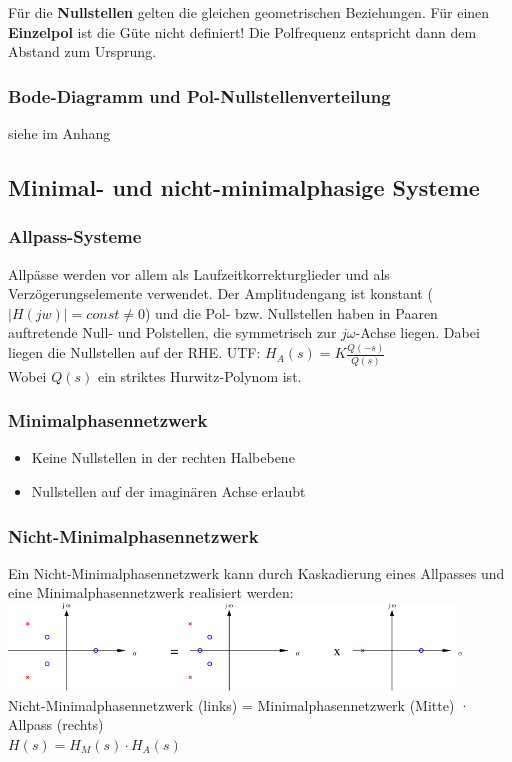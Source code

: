  Für die \textbf{Nullstellen} gelten die gleichen geometrischen Beziehungen.
  Für einen \textbf{Einzelpol} ist die Güte nicht definiert! Die Polfrequenz entspricht dann dem Abstand zum Ursprung.
  
  \subsubsection{Bode-Diagramm und Pol-Nullstellenverteilung}
  siehe im Anhang

\subsection{Minimal- und nicht-minimalphasige Systeme }
\subsubsection{Allpass-Systeme}
Allpässe werden vor allem als Laufzeitkorrekturglieder und als
Verzögerungselemente verwendet. Der Amplitudengang ist konstant ($|H(jw)| =
const \neq 0$) und die Pol- bzw. Nullstellen haben in Paaren auftretende Null-
und Polstellen, die symmetrisch zur $j \omega$-Achse liegen. Dabei liegen die
Nullstellen auf der RHE.
UTF: $H_A(s) = K \frac{Q(-s)}{Q(s)}$ \\
Wobei $Q(s)$ ein striktes Hurwitz-Polynom ist.



\subsubsection{Minimalphasennetzwerk }
\begin{itemize}
  \item Keine Nullstellen in der rechten Halbebene
  \item Nullstellen auf der imaginären Achse erlaubt
\end{itemize}


\subsubsection{Nicht-Minimalphasennetzwerk}
Ein Nicht-Minimalphasennetzwerk kann durch Kaskadierung eines Allpasses und
eine Minimalphasennetzwerk realisiert werden:\\
\includegraphics[width=12cm]{./images/nicht-minimalphasennetzwerk.png}\\
Nicht-Minimalphasennetzwerk (links) = Minimalphasennetzwerk (Mitte) · Allpass (rechts) \\
$H(s) = H_M(s) \cdot H_A(s)$

